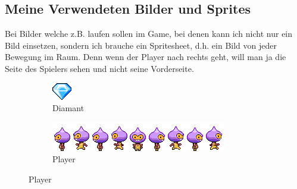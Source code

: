 \documentclass{article}
\begin{document}
\subsection{Meine Verwendeten Bilder und Sprites}
Bei Bilder welche z.B. laufen sollen im Game, bei denen kann ich nicht nur ein Bild einsetzen, sondern ich brauche ein Spritesheet,
d.h. ein Bild von jeder Bewegung im Raum.
Denn wenn der Player nach rechts geht, will man ja die Seite des Spielers sehen und nicht seine Vorderseite.



\begin{figure}[ht]
\centering
\begin{subfigure}{.5\textwidth}
  \centering
  \includegraphics[width=.3\linewidth]{diamond}
  \caption{Diamant}
  \label{fig:sub1}
\end{subfigure}%
\begin{subfigure}{.5\textwidth}
  \centering
  \includegraphics[width=.6\linewidth]{dude}
  \caption{Player}
  \label{fig:sub2}
\end{subfigure}
\end{figure}
\end{document}
